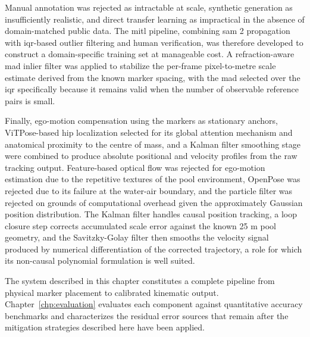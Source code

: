 Manual annotation was rejected as
intractable at scale, synthetic generation as insufficiently realistic, and direct transfer
learning as impractical in the absence of domain-matched public data. The \gls{mitl}
pipeline, combining \gls{sam} 2 propagation with \gls{iqr}-based outlier filtering and human verification,
was therefore developed to construct a domain-specific training set at manageable cost. A
refraction-aware \gls{mad} inlier filter was applied to stabilize the per-frame pixel-to-metre scale
estimate derived from the known marker spacing, with the \gls{mad} selected over the \gls{iqr} specifically
because it remains valid when the number of observable reference pairs is small.

Finally,
ego-motion compensation using the markers as stationary anchors, ViTPose-based hip
localization selected for its global attention mechanism and anatomical proximity to the centre
of mass, and a Kalman filter smoothing stage were combined to produce absolute positional and
velocity profiles from the raw tracking output. Feature-based optical flow was rejected for
ego-motion estimation due to the repetitive textures of the pool environment, OpenPose was
rejected due to its failure at the water-air boundary, and the particle filter was rejected on
grounds of computational overhead given the approximately Gaussian position distribution. The Kalman filter handles causal position tracking, a loop closure step corrects
accumulated scale error against the known 25 m pool geometry, and the Savitzky-Golay filter
then smooths the velocity signal produced by numerical differentiation of the corrected
trajectory, a role for which its non-causal polynomial formulation is well suited.

The system described in this chapter constitutes a complete pipeline from physical marker
placement to calibrated kinematic output. Chapter~\ref{chp:evaluation} evaluates each
component against quantitative accuracy benchmarks and characterizes the residual error sources
that remain after the mitigation strategies described here have been applied.
